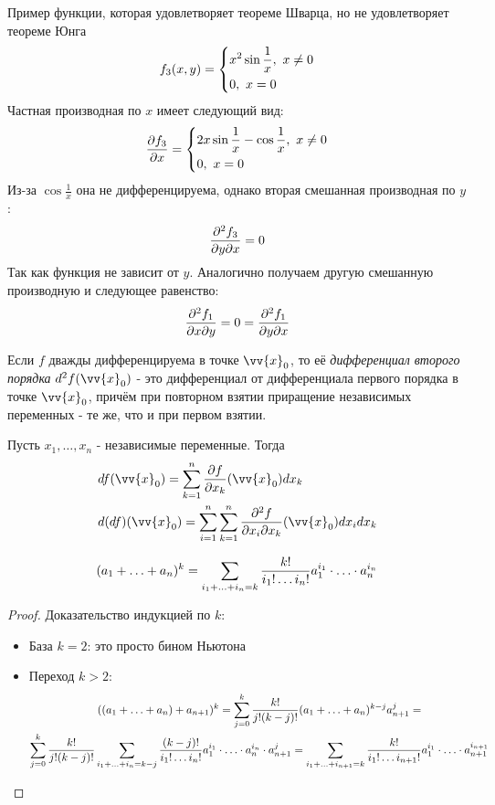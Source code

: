 \begin{example}
	Пример функции, которая удовлетворяет теореме Шварца, но не удовлетворяет теореме Юнга
	\[
		f_3(x, y) = \left\{\begin{aligned}
			&{x^2 \sin \frac{1}{x},\ x \neq 0}
			\\
			&{0,\ x = 0}
		\end{aligned}\right.
	\]
	Частная производная по $x$ имеет следующий вид:
	\[
		\frac{\partial f_3}{\partial x} = \left\{\begin{aligned}
			&{2x \sin \frac{1}{x} - \cos\frac{1}{x},\ x \neq 0}
			\\
			&{0,\ x = 0}
		\end{aligned}\right.
	\]
	Из-за $\cos \frac{1}{x}$ она не дифференцируема, однако вторая смешанная производная по $y$:
	\[
		\frac{\partial^2 f_3}{\partial y \partial x} = 0
	\]
	Так как функция не зависит от $y$. Аналогично получаем другую смешанную производную и следующее равенство:
	\[
		\frac{\partial^2 f_1}{\partial x \partial y} = 0 = \frac{\partial^2 f_1}{\partial y \partial x}
	\]
\end{example}

\begin{definition}
	Если $f$ дважды дифференцируема в точке $\vv{x}_0$, то её \textit{дифференциал второго порядка} $d^2 f(\vv{x}_0)$ - это дифференциал от дифференциала первого порядка в точке $\vv{x}_0$, причём при повторном взятии приращение независимых переменных - те же, что и при первом взятии.
\end{definition}

\begin{note}
	Пусть $x_1, \ldots, x_n$ - независимые переменные. Тогда
	\begin{align*}
		&{df(\vv{x}_0) = \suml_{k = 1}^n \pd{f}{x_k} (\vv{x}_0) dx_k}
		\\
		&{d(df)(\vv{x}_0) = \suml_{i = 1}^n \suml_{k = 1}^n \frac{\vdelta^2 f}{\vdelta x_i \vdelta x_k} (\vv{x}_0) dx_i dx_k}
	\end{align*}
\end{note}

\begin{lemma}
	\[
		(a_1 + \ldots + a_n)^k = \sum\limits_{i_1 + \ldots + i_n = k} \frac{k!}{i_1! \ldots i_n!} a_1^{i_1} \cdot \ldots \cdot a_n^{i_n}
	\]
\end{lemma}

\begin{proof}
	Доказательство индукцией по $k$:
	\begin{itemize}
		\item База $k = 2$: это просто бином Ньютона
		
		\item Переход $k > 2$:
		\begin{multline*}
			((a_1 + \ldots + a_n) + a_{n + 1})^k = \sum\limits_{j = 0}^k \frac{k!}{j! (k - j)!} (a_1 + \ldots + a_n)^{k - j} a_{n + 1}^j =
			\\
			\sum\limits_{j = 0}^k \frac{k!}{j! (k - j)!} \sum\limits_{i_1 + \ldots + i_n = k - j} \frac{(k - j)!}{i_1! \ldots i_n!} a_1^{i_1} \cdot \ldots \cdot a_n^{i_n} \cdot a_{n + 1}^j = \sum\limits_{i_1 + \ldots + i_{n + 1} = k} \frac{k!}{i_1! \ldots i_{n + 1}!} a_1^{i_1} \cdot \ldots \cdot a_{n + 1}^{i_{n + 1}}
		\end{multline*}
	\end{itemize}
\end{proof}


